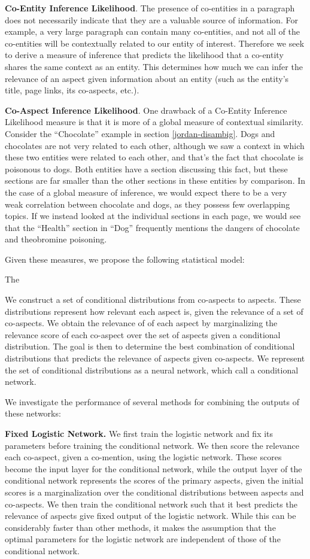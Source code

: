 \documentclass[sigconf,authordraft]{acmart}
\begin{document}
\textbf{Co-Entity Inference Likelihood}. The presence of co-entities in a paragraph does not necessarily indicate that they are a valuable source of information. For example, a very large paragraph can contain many co-entities, and not all of the co-entities will be contextually related to our entity of interest. Therefore we seek to derive a measure of inference that predicts the likelihood that a co-entity shares the same context as an entity. This determines how much we can infer the relevance of an aspect given information about an entity (such as the entity's title, page links, its co-aspects, etc.).

\textbf{Co-Aspect Inference Likelihood}. One drawback of a Co-Entity Inference Likelihood measure is that it is more of a global measure of contextual similarity. Consider the ``Chocolate'' example in section \ref{jordan-disambig}. Dogs and chocolates are not very related to each other, although we saw a context in which these two entities were related to each other, and that's the fact that chocolate is poisonous to dogs. Both entities have a section discussing this fact, but these sections are far smaller than the other sections in these entities by comparison. In the case of a global measure of inference, we would expect there to be a very weak correlation between chocolate and dogs, as they possess few overlapping topics. If we instead looked at the individual sections in each page, we would see that the ``Health'' section in ``Dog'' frequently mentions the dangers of chocolate and theobromine poisoning. 

Given these measures, we propose the following statistical model:

The 

We construct a set of conditional distributions from co-aspects to aspects.
These distributions represent how relevant each aspect is, given the relevance of a set of co-aspects.
We obtain the relevance of of each aspect by marginalizing the relevance score of each co-aspect over the set of aspects given a conditional distribution.
The goal is then to determine the best combination of conditional distributions that predicts the relevance of aspects given co-aspects.
We represent the set of conditional distributions as a neural network, which call a conditional network.

We investigate the performance of several methods for combining the outputs of these networks:

\textbf{Fixed Logistic Network.} We first train the logistic network and fix its parameters before training the conditional network. We then score the relevance each co-aspect, given a co-mention, using the logistic network. These scores become the input layer for the conditional network, while the output layer of the conditional network represents the scores of the primary aspects, given the initial scores  is a marginalization over the conditional distributions between aspects and co-aspects. We then train the conditional network such that it best predicts the relevance of aspects give fixed output of the logistic network. While this can be considerably faster than other methods, it makes the assumption that the optimal parameters for the logistic network are independent of those of the conditional network.
\end{document}
